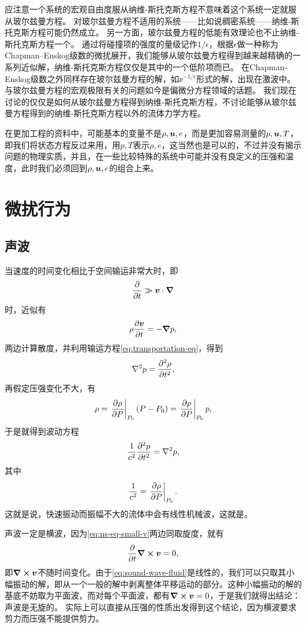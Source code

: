 应注意一个系统的宏观自由度服从纳维-斯托克斯方程不意味着这个系统一定就服从玻尔兹曼方程。
对玻尔兹曼方程不适用的系统——比如说稠密系统——纳维-斯托克斯方程可能仍然成立。
另一方面，玻尔兹曼方程的低能有效理论也不止纳维-斯托克斯方程一个。
通过将碰撞项的强度的量级记作$1/\epsilon$，根据$\epsilon$做一种称为Chapman–Enskog级数的微扰展开\cite{chapman_mathematical_1990}，我们能够从玻尔兹曼方程得到越来越精确的一系列近似解，纳维-斯托克斯方程仅仅是其中的一个低阶项而已。
在Chapman-Enskog级数之外同样存在玻尔兹曼方程的解，如$\ee^{- 1 / \epsilon}$形式的解，出现在激波中。    
与玻尔兹曼方程的宏观极限有关的问题如今是偏微分方程领域的话题。
我们现在讨论的仅仅是如何从玻尔兹曼方程得到纳维-斯托克斯方程，不讨论能够从玻尔兹曼方程得到的纳维-斯托克斯方程以外的流体力学方程。

在更加工程的资料中，可能基本的变量不是$\rho, \vb*{u}, e$，而是更加容易测量的$p, \vb*{u}, T$，即我们将状态方程反过来用，用$p, T$表示$\rho, e$，这当然也是可以的，不过并没有揭示问题的物理实质，并且，在一些比较特殊的系统中可能并没有良定义的压强和温度，此时我们必须回到$\rho, \vb*{u}, e$的组合上来。

\section{微扰行为}

\subsection{声波}

当速度的时间变化相比于空间输运非常大时，即
\[
    \pdv{t} \gg \vb*{v} \cdot \grad
\]
时，近似有
\begin{equation}
    \rho \pdv{\vb*{v}}{t} = - \grad{p},
    \label{eq:ns-eq-small-v}
\end{equation}
两边计算散度，并利用输运方程\eqref{eq:transportation-eq}，得到
\[
    \laplacian{p} = \pdv[2]{\rho}{t},
\]
再假定压强变化不大，有
\[
    \rho = \eval{\pdv{\rho}{P}}_{P_0} (P - P_0) = \eval{\pdv{\rho}{P}}_{P_0} p,
\]
于是就得到波动方程
\begin{equation}
    \frac{1}{c^2} \pdv[2]{p}{t} = \laplacian{p},
    \label{eq:sound-wave-fluid}
\end{equation}
其中
\begin{equation}
    \frac{1}{c^2} = \eval{\pdv{\rho}{P}}_{P_0}.
\end{equation}
这就是说，快速振动而振幅不大的流体中会有线性机械波，这就是。

声波一定是横波，因为\eqref{eq:ns-eq-small-v}两边同取旋度，就有
\[
    \pdv{t} \curl{\vb*{v}} = 0, 
\]
即$\curl{\vb*{v}}$不随时间变化。由于\eqref{eq:sound-wave-fluid}是线性的，我们可以只取其小幅振动的解，即从一个一般的解中剥离整体平移运动的部分。这种小幅振动的解的基底不妨取为平面波，而对每个平面波，都有$\curl{\vb*{v}}=0$，于是我们就得出结论：声波是无旋的。
实际上可以直接从压强的性质出发得到这个结论，因为横波要求剪力而压强不能提供剪力。